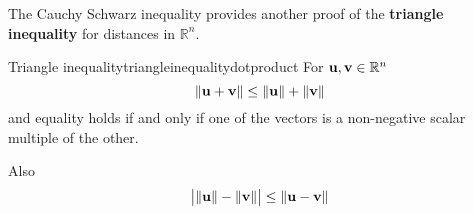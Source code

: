The Cauchy Schwarz inequality provides another proof of the \textbf{triangle
inequality} for
distances in $\mathbb{R}^{n}$.

\begin{theorem}{Triangle inequality}{triangleinequalitydotproduct}
  For ${\bf u},{\bf v}\in \mathbb{R}^{n}$
\begin{equation}
\| {\bf u}+{\bf v}\| \leq \| {\bf u}\| +\| {\bf v}
\|  \label{triangleineq1}
\end{equation}
and equality holds if and only if one of the vectors is a non-negative scalar
multiple of the other. 

Also
\begin{equation}
\big| \| {\bf u}\| -\| {\bf v}\| \big| \leq
\| {\bf u}-{\bf v}\|  \label{triangleineq2}
\end{equation}
\end{theorem}

